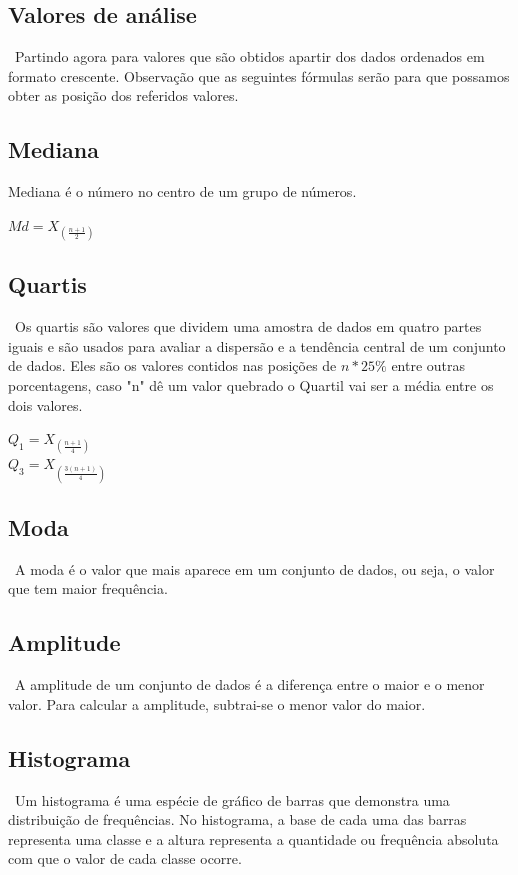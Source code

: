 \documentclass{article}
\begin{document}
\begin{multicols}{2}
        \subsection{Valores de análise}
        \ Partindo agora para valores que são obtidos apartir dos dados ordenados em formato crescente. 
        Observação que as seguintes fórmulas serão para que possamos obter as posição dos referidos valores.    
        \subsection{Mediana}
        Mediana é o número no centro de um grupo de números.
        \begin{center}
          $ Md = X_{\left(\frac{n + 1}{2}\right)} $
        \end{center}

        \subsection{Quartis}
        \ Os quartis são valores que dividem uma amostra de dados em quatro partes iguais e são usados para 
        avaliar a dispersão e a tendência central de um conjunto de dados. Eles são os valores contidos nas 
        posições de $ n*25\% $ entre outras porcentagens, caso "n" dê um valor quebrado o Quartil vai ser a 
        média entre os dois valores.
        \begin{center}
          $ Q_1 = X_{\left(\frac{n + 1}{4}\right)} $ \\
          $ Q_3 = X_{\left(\frac{3(n + 1)}{4}\right)} $
        \end{center}

        \subsection{Moda}
        \ A moda é o valor que mais aparece em um conjunto de dados, ou seja, o valor que tem maior frequência.

        \subsection{Amplitude}
        \ A amplitude de um conjunto de dados é a diferença entre o maior e o menor valor. Para calcular a amplitude, 
        subtrai-se o menor valor do maior. 

        \subsection{Histograma}
        \ Um histograma é uma espécie de gráfico de barras que demonstra uma distribuição de frequências. No histograma, 
        a base de cada uma das barras representa uma classe e a altura representa a quantidade ou frequência absoluta com 
        que o valor de cada classe ocorre.


\end{multicols}
\end{document}
